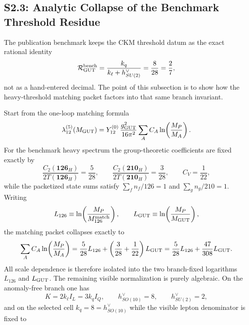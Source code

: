 \documentclass[11pt]{article}
\begin{document}
\subsection*{S2.3: Analytic Collapse of the Benchmark Threshold Residue}
\label{supp-sec:s23-rgut-identity}

The publication benchmark keeps the CKM threshold datum as the exact rational identity
\begin{equation}
 \mathcal R_{\rm GUT}^{\rm bench}
 =
 \frac{k_q}{k_{\ell}+h^{\vee}_{SU(2)}}
 =
 \frac{8}{28}
 =
 \frac{2}{7},
\end{equation}
not as a hand-entered decimal. The point of this subsection is to show how the heavy-threshold matching packet factors into that same branch invariant.

Start from the one-loop matching formula
\begin{equation}
 \lambda_{12}^{(5)}(M_{\rm GUT})
 =
 Y_{12}^{(0)}\,\frac{g_{\rm GUT}^2}{16\pi^2}
 \sum_A C_A\ln\!\left(\frac{M_P}{M_A}\right).
\end{equation}
For the benchmark heavy spectrum the group-theoretic coefficients are fixed exactly by
\begin{equation}
 \frac{C_2(\mathbf{126}_H)}{2T(\mathbf{126}_H)}=\frac{5}{28},
 \qquad
 \frac{C_2(\mathbf{210}_H)}{2T(\mathbf{210}_H)}=\frac{3}{28},
 \qquad
 C_V=\frac{1}{22},
\end{equation}
while the packetized state sums satisfy $\sum_f n_f/126=1$ and $\sum_g n_g/210=1$. Writing
\begin{equation}
 L_{126}\equiv\ln\!\left(\frac{M_P}{M_{126}^{\rm match}}\right),
 \qquad
 L_{\rm GUT}\equiv\ln\!\left(\frac{M_P}{M_{\rm GUT}}\right),
\end{equation}
the matching packet collapses exactly to
\begin{equation}
 \sum_A C_A\ln\!\left(\frac{M_P}{M_A}\right)
 =
 \frac{5}{28}L_{126}
 +
 \left(\frac{3}{28}+\frac{1}{22}\right)L_{\rm GUT}
 =
 \frac{5}{28}L_{126}+\frac{47}{308}L_{\rm GUT}.
\end{equation}
All scale dependence is therefore isolated into the two branch-fixed logarithms $L_{126}$ and $L_{\rm GUT}$. The remaining visible normalization is purely algebraic. On the anomaly-free branch one has
\begin{equation}
 K=2k_{\ell}I_L=3k_qI_Q,
 \qquad
 h^{\vee}_{SO(10)}=8,
 \qquad
 h^{\vee}_{SU(2)}=2,
\end{equation}
and on the selected cell $k_q=8=h^{\vee}_{SO(10)}$ while the visible lepton denominator is fixed to
\end{document}
